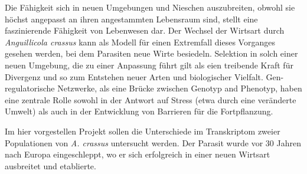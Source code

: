 

\begin{zusammenfassung}        %


  Die Fähigkeit sich in neuen Umgebungen und Nieschen auszubreiten,
  obwohl sie höchst angepasst an ihren angestammten Lebensraum sind,
  stellt eine faszinierende Fähigkeit von Lebenwesen dar. Der Wechsel
  der Wirtsart durch \textit{Anguillicola crassus} kann als Modell für
  einen Extremfall dieses Vorganges gesehen werden, bei dem Parasiten
  neue Wirte besiedeln. Selektion in solch einer neuen Umgebung, die
  zu einer Anpassung führt gilt als eien treibende Kraft für Divergenz
  und so zum Entstehen neuer Arten und biologischer Vielfalt.
  Gen-regulatorische Netzwerke, als eine Brücke zwischen Genotyp and
  Phenotyp, haben eine zentrale Rolle sowohl in der Antwort auf Stress
  (etwa durch eine veränderte Umwelt) als auch in der Entwicklung von
  Barrieren für die Fortpflanzung.

  Im hier vorgestellen Projekt sollen die Unterschiede im Transkriptom
  zweier Populationen von \textit{A. crassus} untersucht werden. Der
  Parasit wurde vor 30 Jahren nach Europa eingeschleppt, wo er sich
  erfolgreich in einer neuen Wirtsart ausbreitet und etablierte.



\end{zusammenfassung}





